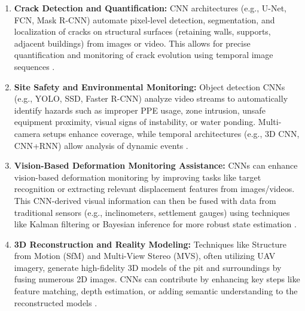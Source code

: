 \documentclass[preprint,11pt,authoryear,3p]{elsarticle}
\begin{document}
\begin{enumerate}
    \item \textbf{Crack Detection and Quantification:} CNN architectures (e.g., U-Net, FCN, Mask R-CNN) automate pixel-level detection, segmentation, and localization of cracks on structural surfaces (retaining walls, supports, adjacent buildings) from images or video. This allows for precise quantification and monitoring of crack evolution using temporal image sequences \citep{https://doi.org/10.1002/stc.2981}.

    \item \textbf{Site Safety and Environmental Monitoring:} Object detection CNNs (e.g., YOLO, SSD, Faster R-CNN) analyze video streams to automatically identify hazards such as improper PPE usage, zone intrusion, unsafe equipment proximity, visual signs of instability, or water ponding. Multi-camera setups enhance coverage, while temporal architectures (e.g., 3D CNN, CNN+RNN) allow analysis of dynamic events \citep{LIU2022104302}.

    \item \textbf{Vision-Based Deformation Monitoring Assistance:} CNNs can enhance vision-based deformation monitoring by improving tasks like target recognition or extracting relevant displacement features from images/videos. This CNN-derived visual information can then be fused with data from traditional sensors (e.g., inclinometers, settlement gauges) using techniques like Kalman filtering or Bayesian inference for more robust state estimation \citep{SHEN2023100442}.

    \item \textbf{3D Reconstruction and Reality Modeling:} Techniques like Structure from Motion (SfM) and Multi-View Stereo (MVS), often utilizing UAV imagery, generate high-fidelity 3D models of the pit and surroundings by fusing numerous 2D images. CNNs can contribute by enhancing key steps like feature matching, depth estimation, or adding semantic understanding to the reconstructed models \citep{WU2021103706, rs14205187}.
\end{enumerate}
\end{document}
